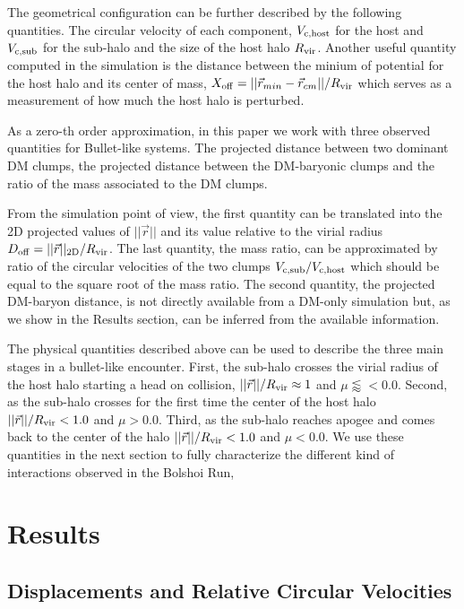 \documentclass{emulateapj}
\begin{document}
The geometrical configuration can be further described by the
following quantities. The circular velocity of each component, $V_{\rm
  c,host}$ for the host and $V_{\rm c, sub}$ for the sub-halo and the
size of the host halo $R_{\rm vir}$. Another useful quantity computed
in the simulation is the distance between the minium of potential for
the host halo and its center of mass, $X_{\rm
  off}=||\vec{r}_{min}-\vec{r}_{cm}||/R_{\rm vir}$ which serves as a
measurement of how much the host halo is perturbed.

As a zero-th order approximation, in this paper we work with three
observed quantities for Bullet-like systems. The projected distance
between two dominant DM clumps, the projected distance between the
DM-baryonic clumps and the ratio of the mass associated to the DM
clumps.

From the simulation point of view, the first quantity can be
translated into the 2D projected values of $||\vec{r}||$ and its value
relative to the virial radius $D_{\rm   off}= ||\vec{r}||_{\rm
  2D}/R_{\rm vir}$. The last quantity, the mass ratio, can be
approximated by ratio of the circular velocities of the two clumps $V_{\rm c,sub}/V_{\rm  c,host}$ which should be equal to the square root of the mass
ratio. The second quantity, the projected DM-baryon distance, is not
directly available from a DM-only simulation but, as we show in the
Results section, can be inferred from the available information.  
 
The physical quantities described above can be used to describe
the three main stages in a bullet-like encounter. First, the sub-halo
crosses the virial radius of the host halo starting a head on
collision, $||\vec{r}||/R_{\rm vir}\approx 1$ and
$\mu\lessapprox<0.0$. Second, as the sub-halo crosses for the first time
the center of the host halo $||\vec{r}||/R_{\rm vir} < 1.0$ and
$\mu>0.0$. Third, as the sub-halo reaches apogee and comes back to the
center of the halo $||\vec{r}||/R_{\rm vir} < 1.0$ and $\mu<0.0$. We use
these quantities in the next section to fully characterize the different
kind of interactions observed in the Bolshoi Run,


\section{Results}
\label{sec:results}

\subsection{Displacements and Relative Circular Velocities}
\label{fig:displacement}
\end{document}
